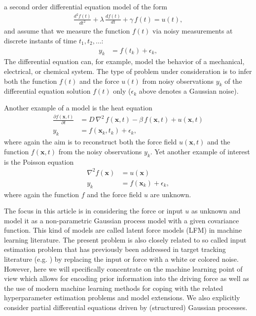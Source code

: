 \documentclass[journal]{IEEEtran}
\begin{document}
 a second order differential equation model of the form
%
\begin{equation}
\begin{split}
  \frac{d^{2}f(t)}{dt^{2}} + \lambda \, \frac{df(t)}{dt} + \gamma \, f(t) = u(t),
\end{split}
\end{equation}
%
and assume that we measure the function $f(t)$ via noisy measurements at discrete instants of time $t_1,t_2,\ldots$:
%
\begin{equation}
\begin{split}
  y_k &= f(t_k) + \epsilon_k,
\end{split}
\end{equation}
%
The differential equation can, for example, model the behavior of a mechanical, electrical, or chemical system. The type of problem under consideration is to infer both the function $f(t)$ and the force $u(t)$ from noisy observations $y_k$ of the differential equation solution $f(t)$ only ($\epsilon_k$ above denotes a Gaussian noise). 

Another example of a model is the heat equation
%
\begin{equation}
\begin{split}
  \frac{\partial f(\mathbf{x},t)}{\partial t} &=
  D \, \nabla^2 \, f(\mathbf{x},t) - \beta \, f(\mathbf{x},t) + u(\mathbf{x},t) \\
  y_k &= f(\mathbf{x}_k,t_k) + \epsilon_k,
\end{split}
\end{equation}
%
where again the aim is to reconstruct both the force field $u(\mathbf{x},t)$ and the function $f(\mathbf{x},t)$ from the noisy observations $y_k$. Yet another example of interest is the Poisson equation
%
\begin{equation}
\begin{split}
  \nabla^2 f(\mathbf{x}) &= u(\mathbf{x}) \\
  y_k &= f(\mathbf{x}_k) + \epsilon_k,
\end{split}
\end{equation}
%
where again the function $f$ and the force field $u$ are unknown. 

The focus in this article is in considering the force or input $u$ as unknown and model it as a non-parametric Gaussian process model \cite{Rasmussen+Williams:2006} with a given covariance function. This kind of models are called latent force models (LFM) \cite{Alvarez+Lawrence:2009,Alvarez:2010,Alvarez+Luengo+Lawrence:2013} in machine learning literature. The present problem is also closely related to so called input estimation problem that has previously been addressed in target tracking literature (e.g. \cite{Bar-Shalom+Li+Kirubarajan:2001}) by replacing the input or force with a white or colored noise. However, here we will specifically concentrate on the machine learning point of view which allows for encoding prior information into the driving force as well as the use of modern machine learning methods for coping with the related hyperparameter estimation problems and model extensions. We also explicitly consider partial differential equations driven by (structured) Gaussian processes.
\end{document}
